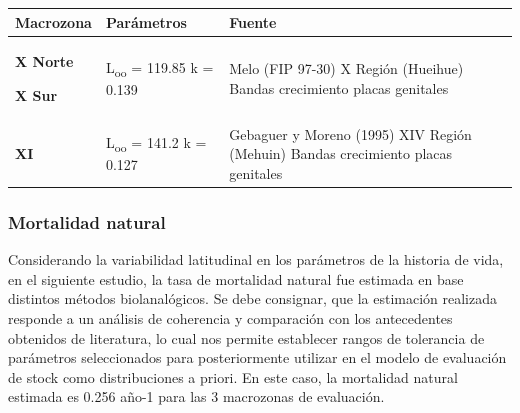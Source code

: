 \documentclass[
]{article}
\begin{document}
\begin{longtable}[]{@{}lll@{}}
\toprule
\begin{minipage}[b]{0.12\columnwidth}\raggedright
\textbf{Macrozona}\strut
\end{minipage} & \begin{minipage}[b]{0.20\columnwidth}\raggedright
\textbf{Parámetros}\strut
\end{minipage} & \begin{minipage}[b]{0.60\columnwidth}\raggedright
\textbf{Fuente}\strut
\end{minipage}\tabularnewline
\midrule
\endhead
\begin{minipage}[t]{0.12\columnwidth}\raggedright
\textbf{X Norte}

\textbf{X Sur}\strut
\end{minipage} & \begin{minipage}[t]{0.20\columnwidth}\raggedright
L\textsubscript{oo} = 119.85 k = 0.139\strut
\end{minipage} & \begin{minipage}[t]{0.60\columnwidth}\raggedright
Melo (FIP 97-30) X Región (Hueihue) Bandas crecimiento placas
genitales\strut
\end{minipage}\tabularnewline
\begin{minipage}[t]{0.12\columnwidth}\raggedright
\textbf{XI}\strut
\end{minipage} & \begin{minipage}[t]{0.20\columnwidth}\raggedright
L\textsubscript{oo} = 141.2 k = 0.127\strut
\end{minipage} & \begin{minipage}[t]{0.60\columnwidth}\raggedright
Gebaguer y Moreno (1995) XIV Región (Mehuin) Bandas crecimiento placas
genitales\strut
\end{minipage}\tabularnewline
\bottomrule
\end{longtable}

\hypertarget{mortalidad-natural}{%
\subsubsection{Mortalidad natural}\label{mortalidad-natural}}

Considerando la variabilidad latitudinal en los parámetros de la
historia de vida, en el siguiente estudio, la tasa de mortalidad natural
fue estimada en base distintos métodos biolanalógicos. Se debe
consignar, que la estimación realizada responde a un análisis de
coherencia y comparación con los antecedentes obtenidos de literatura,
lo cual nos permite establecer rangos de tolerancia de parámetros
seleccionados para posteriormente utilizar en el modelo de evaluación de
stock como distribuciones a priori. En este caso, la mortalidad natural
estimada es 0.256 año-1 para las 3 macrozonas de evaluación.
\end{document}
